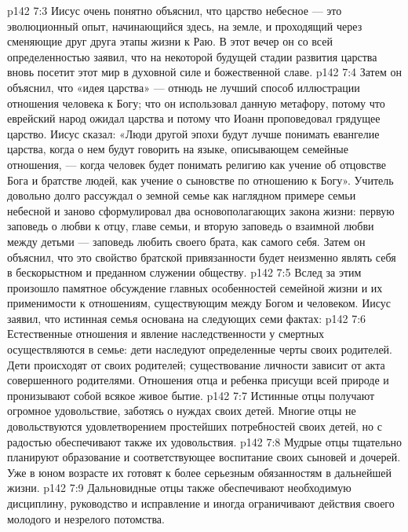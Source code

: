 \vs p142 7:3 Иисус очень понятно объяснил, что царство небесное --- это эволюционный опыт, начинающийся здесь, на земле, и проходящий через сменяющие друг друга этапы жизни к Раю. В этот вечер он со всей определенностью заявил, что на некоторой будущей стадии развития царства вновь посетит этот мир в духовной силе и божественной славе.
\vs p142 7:4 Затем он объяснил, что «идея царства» --- отнюдь не лучший способ иллюстрации отношения человека к Богу; что он использовал данную метафору, потому что еврейский народ ожидал царства и потому что Иоанн проповедовал грядущее царство. Иисус сказал: «Люди другой эпохи будут лучше понимать евангелие царства, когда о нем будут говорить на языке, описывающем семейные отношения, --- когда человек будет понимать религию как учение об отцовстве Бога и братстве людей, как учение о сыновстве по отношению к Богу». Учитель довольно долго рассуждал о земной семье как наглядном примере семьи небесной и заново сформулировал два основополагающих закона жизни: первую заповедь о любви к отцу, главе семьи, и вторую заповедь о взаимной любви между детьми --- заповедь любить своего брата, как самого себя. Затем он объяснил, что это свойство братской привязанности будет неизменно являть себя в бескорыстном и преданном служении обществу.
\vs p142 7:5 Вслед за этим произошло памятное обсуждение главных особенностей семейной жизни и их применимости к отношениям, существующим между Богом и человеком. Иисус заявил, что истинная семья основана на следующих семи фактах:
\vs p142 7:6 \bibnobreakspace {} Естественные отношения и явление наследственности у смертных осуществляются в семье: дети наследуют определенные черты своих родителей. Дети происходят от своих родителей; существование личности зависит от акта совершенного родителями. Отношения отца и ребенка присущи всей природе и пронизывают собой всякое живое бытие.
\vs p142 7:7 \bibnobreakspace {} Истинные отцы получают огромное удовольствие, заботясь о нуждах своих детей. Многие отцы не довольствуются удовлетворением простейших потребностей своих детей, но с радостью обеспечивают также их удовольствия.
\vs p142 7:8 \bibnobreakspace {} Мудрые отцы тщательно планируют образование и соответствующее воспитание своих сыновей и дочерей. Уже в юном возрасте их готовят к более серьезным обязанностям в дальнейшей жизни.
\vs p142 7:9 \bibnobreakspace {}  Дальновидные отцы также обеспечивают необходимую дисциплину, руководство и исправление и иногда ограничивают действия своего молодого и незрелого потомства.
